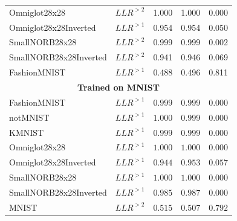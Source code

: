 {\begin{columns}
\begin{column}{0.5\textwidth}
\begin{table}[t]
{\begin{tabular}{llrrr}
        Omniglot28x28            &  $LLR^{>2}$            &  1.000  &  1.000  &  0.000 \\
        Omniglot28x28Inverted    &  $LLR^{>1}$            &  0.954  &  0.954  &  0.050 \\
        SmallNORB28x28           &  $LLR^{>2}$            &  0.999  &  0.999  &  0.002 \\
        SmallNORB28x28Inverted   &  $LLR^{>2}$            &  0.941  &  0.946  &  0.069 \\
        FashionMNIST             &  $LLR^{>1}$            &  0.488  &  0.496  &  0.811 \\
                 \midrule
                 \multicolumn{5}{c}{\textbf{Trained on MNIST}} \\
                 \midrule
        FashionMNIST                   &  $LLR^{>1}$  &  $0.999$  &  $0.999$  &  $0.000$ \\
        notMNIST                       &  $LLR^{>1}$  &  $1.000$  &  $0.999$  &  $0.000$ \\
        KMNIST                         &  $LLR^{>1}$  &  $0.999$  &  $0.999$  &  $0.000$ \\
        Omniglot28x28                  &  $LLR^{>1}$  &  $1.000$  &  $1.000$  &  $0.000$ \\
        Omniglot28x28Inverted          &  $LLR^{>1}$  &  $0.944$  &  $0.953$  &  $0.057$ \\
        SmallNORB28x28                 &  $LLR^{>1}$  &  $1.000$  &  $1.000$  &  $0.000$ \\
        SmallNORB28x28Inverted         &  $LLR^{>1}$  &  $0.985$  &  $0.987$  &  $0.000$ \\
        MNIST                          &  $LLR^{>2}$  &  $0.515$  &  $0.507$  &  $0.792$ \\
                 \bottomrule
            \end{tabular}
            }
        \end{table}
    \end{column}

    \end{columns}
}


    

